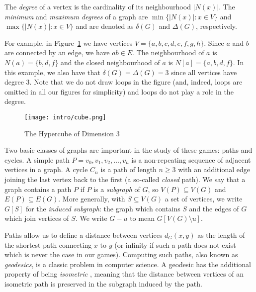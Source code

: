 
The \textit{degree} of a vertex is the cardinality of its neighbourhood $\lvert N(x) \rvert$. The \textit{minimum} and \textit{maximum degrees} of a graph are $\min\{ \lvert N(x)\rvert : x \in V\}$ and $\max \{ \lvert N(x)\rvert : x \in V\}$ and are denoted as $\delta(G)$ and $\Delta(G)$, respectively.

For example, in Figure~\ref{fig:hyper-cube} we have vertices $V = \{ a, b, c, d, e, f, g, h \}$.
Since $a$ and $b$ are connected by an edge, we have $ab \in E$.
The neighbourhood of $a$ is $N(a) = \{ b,d,f \}$ and the closed neighbourhood of $a$ is
$N[a] = \{ a, b, d, f \}$. In this example, we also have that $\delta(G) = \Delta(G) = 3$ since all vertices have degree 3. Note that we do not draw loops in the figure (and, indeed, loops are omitted in all our figures for simplicity) and loops do not play a role in the degree.

\begin{figure}
\centering
\texttt{[image: intro/cube.png]}
\caption{The Hypercube of Dimension 3 \label{fig:hyper-cube}}
\end{figure}

Two basic classes of graphs are important in the study of these games: paths and cycles.
A simple path $P = v_0, v_1, v_2, \dots , v_n$ is a non-repeating sequence of
adjacent vertices in a graph. A cycle $C_n$ is a path of length $n \geq 3$ with an additional edge joining the last vertex back to the first (a so-called \textit{closed} path).
We say that a graph contains a path $P$ if $P$ is a \textit{subgraph} of $G$, so $V(P) \subseteq V(G)$ and $E(P) \subseteq E(G)$. More generally, with $S \subseteq V(G)$ a set of vertices, we write $G[S]$ for the \textit{induced subgraph}: the graph which contains $S$ and the edges of $G$ which join vertices of $S$. We write $G - u$ to mean $G[V(G) \setminus u]$.

Paths allow us to define a distance between vertices $d_G(x,y)$ as the length of the shortest path connecting $x$ to $y$ (or infinity if such a path does not exist which is never the case in our games). Computing such paths, also known as \textit{geodesics}, is a classic problem in computer science.
A geodesic has the additional property of being \textit{isometric} \cite{pan2006isometric}, meaning that the distance between vertices of an isometric path is preserved in the subgraph induced by the path.

